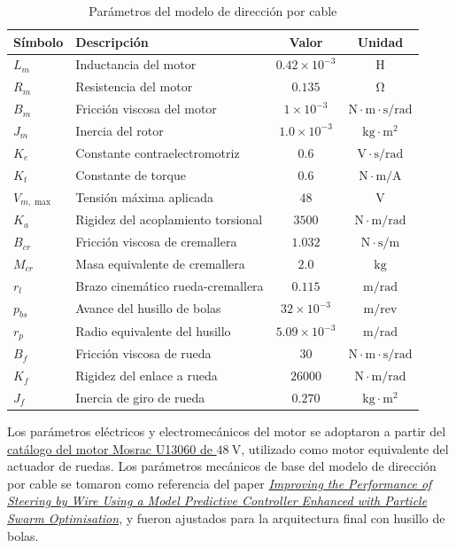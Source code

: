 \documentclass{article}
\begin{document}
\begin{table}[H]
\small
\centering
\caption{Parámetros del modelo de dirección por cable}
\label{tab:parametros_modelo}
\begin{tabular}{l l c c}
\toprule
\textbf{Símbolo} & \textbf{Descripción} & \textbf{Valor} & \textbf{Unidad} \\
\midrule
$L_m$     & Inductancia del motor & $0.42 \times 10^{-3}$ & $\mathrm{H}$ \\
$R_m$     & Resistencia del motor & $0.135$   & $\mathrm{\Omega}$ \\
$B_m$     & Fricción viscosa del motor & $1 \times 10^{-3}$ & $\mathrm{N \cdot m \cdot s / rad}$ \\
$J_m$     & Inercia del rotor & $1.0 \times 10^{-3}$ & $\mathrm{kg \cdot m^2}$ \\
$K_e$     & Constante contraelectromotriz & $0.6$     & $\mathrm{V \cdot s / rad}$ \\
$K_t$     & Constante de torque & $0.6$     & $\mathrm{N \cdot m / A}$ \\
$V_{m,\max}$ & Tensión máxima aplicada & $48$   & $\mathrm{V}$ \\
\midrule
$K_a$     & Rigidez del acoplamiento torsional & $3500$    & $\mathrm{N \cdot m / rad}$ \\
\midrule
$B_{cr}$  & Fricción viscosa de cremallera & $1.032$   & $\mathrm{N \cdot s / m}$ \\
$M_{cr}$  & Masa equivalente de cremallera & $2.0$     & $\mathrm{kg}$ \\
$r_l$     & Brazo cinemático rueda-cremallera & $0.115$   & $\mathrm{m/rad}$ \\
$p_{bs}$  & Avance del husillo de bolas & $32 \times 10^{-3}$ & $\mathrm{m/rev}$ \\
$r_p$     & Radio equivalente del husillo & $5.09 \times 10^{-3}$ & $\mathrm{m/rad}$ \\
\midrule
$B_f$     & Fricción viscosa de rueda & $30$      & $\mathrm{N \cdot m \cdot s / rad}$ \\
$K_f$     & Rigidez del enlace a rueda & $26000$   & $\mathrm{N \cdot m / rad}$ \\
$J_f$     & Inercia de giro de rueda & $0.270$   & $\mathrm{kg \cdot m^2}$ \\
\bottomrule
\end{tabular}
\end{table}

Los parámetros eléctricos y electromecánicos del motor se adoptaron a partir del \hyperlink{ref:mosrac-u13060}{catálogo del motor Mosrac U13060 de $48\ \mathrm{V}$}, utilizado como motor equivalente del actuador de ruedas. Los parámetros mecánicos de base del modelo de dirección por cable se tomaron como referencia del paper \hyperlink{ref:taher-2025}{\textit{Improving the Performance of Steering by Wire Using a Model Predictive Controller Enhanced with Particle Swarm Optimisation}}, y fueron ajustados para la arquitectura final con husillo de bolas.
\end{document}
